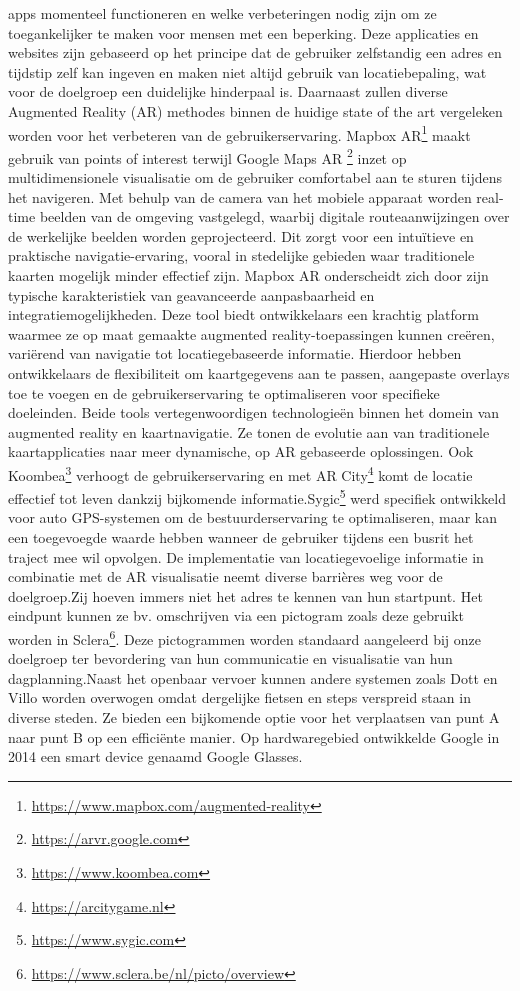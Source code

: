 apps momenteel functioneren en welke verbeteringen nodig zijn om ze toegankelijker te maken voor mensen met een beperking. Deze applicaties en websites zijn gebaseerd op het principe dat de gebruiker zelfstandig een adres en tijdstip zelf kan ingeven en maken niet altijd gebruik van locatiebepaling, wat voor de doelgroep een duidelijke hinderpaal is. Daarnaast zullen diverse Augmented Reality (AR) methodes binnen de huidige state of the art vergeleken worden voor het verbeteren van de gebruikerservaring. Mapbox AR\footnote{\url{https://www.mapbox.com/augmented-reality}} maakt gebruik van points of interest terwijl Google Maps AR \footnote{\url{https://arvr.google.com}} inzet op multidimensionele visualisatie om de gebruiker comfortabel aan te sturen tijdens het navigeren. Met behulp van de camera van het mobiele apparaat worden real-time beelden van de omgeving vastgelegd, waarbij digitale routeaanwijzingen over de werkelijke beelden worden geprojecteerd. Dit zorgt voor een intuïtieve en praktische navigatie-ervaring, vooral in stedelijke gebieden waar traditionele kaarten mogelijk minder effectief zijn. Mapbox AR onderscheidt zich door zijn typische karakteristiek van geavanceerde aanpasbaarheid en integratiemogelijkheden. Deze tool biedt ontwikkelaars een krachtig platform waarmee ze op maat gemaakte augmented reality-toepassingen kunnen creëren, variërend van navigatie tot locatiegebaseerde informatie. Hierdoor hebben ontwikkelaars de flexibiliteit om kaartgegevens aan te passen, aangepaste overlays toe te voegen en de gebruikerservaring te optimaliseren voor specifieke doeleinden. Beide tools vertegenwoordigen technologieën binnen het domein van augmented reality en kaartnavigatie. Ze tonen de evolutie aan van traditionele kaartapplicaties naar meer dynamische, op AR gebaseerde oplossingen. Ook Koombea\footnote{\url{https://www.koombea.com}} verhoogt de gebruikerservaring en met AR City\footnote{\url{https://arcitygame.nl}} komt de locatie effectief tot leven dankzij bijkomende informatie.Sygic\footnote{\url{https://www.sygic.com}} werd specifiek ontwikkeld voor auto GPS-systemen om de bestuurderservaring te optimaliseren, maar kan een toegevoegde waarde hebben wanneer de gebruiker tijdens een busrit het traject mee wil opvolgen. De implementatie van locatiegevoelige informatie in combinatie met de AR visualisatie neemt diverse barrières weg voor de doelgroep.Zij hoeven immers niet het adres te kennen van hun startpunt. Het eindpunt kunnen ze bv. omschrijven via een pictogram zoals deze gebruikt worden in Sclera\footnote{\url{https://www.sclera.be/nl/picto/overview}}. Deze pictogrammen worden standaard aangeleerd bij onze doelgroep ter bevordering van hun communicatie en visualisatie van hun dagplanning.Naast het openbaar vervoer kunnen andere systemen zoals Dott en Villo worden overwogen omdat dergelijke fietsen en steps verspreid staan in diverse steden. Ze bieden een bijkomende optie voor het verplaatsen van punt A naar punt B op een efficiënte manier. Op hardwaregebied ontwikkelde Google in 2014 een smart device genaamd Google Glasses.
